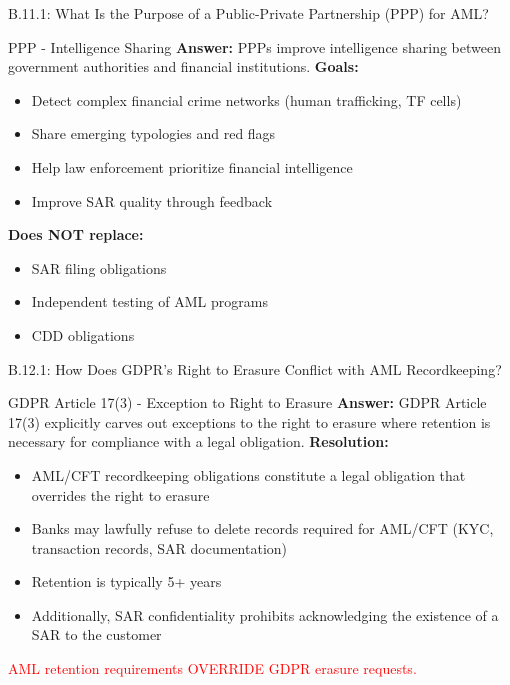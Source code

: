 \documentclass{beamer}
\begin{document}
	
	\begin{frame}{B.11.1: What Is the Purpose of a Public-Private Partnership (PPP) for AML?}
		\begin{block}{PPP - Intelligence Sharing}
			\textbf{Answer:} PPPs improve intelligence sharing between government authorities and financial institutions.
			\vspace{0.2cm}
			\textbf{Goals:}
			\begin{itemize}
				\item Detect complex financial crime networks (human trafficking, TF cells)
				\item Share emerging typologies and red flags
				\item Help law enforcement prioritize financial intelligence
				\item Improve SAR quality through feedback
			\end{itemize}
			\textbf{Does NOT replace:}
			\begin{itemize}
				\item SAR filing obligations
				\item Independent testing of AML programs
				\item CDD obligations
			\end{itemize}
		\end{block}
	\end{frame}
	
	
	\begin{frame}{B.12.1: How Does GDPR's Right to Erasure Conflict with AML Recordkeeping?}
		\begin{block}{GDPR Article 17(3) - Exception to Right to Erasure}
			\textbf{Answer:} GDPR Article 17(3) explicitly carves out exceptions to the right to erasure where retention is necessary for compliance with a legal obligation.
			\vspace{0.2cm}
			\textbf{Resolution:}
			\begin{itemize}
				\item AML/CFT recordkeeping obligations constitute a legal obligation that overrides the right to erasure
				\item Banks may lawfully refuse to delete records required for AML/CFT (KYC, transaction records, SAR documentation)
				\item Retention is typically 5+ years
				\item Additionally, SAR confidentiality prohibits acknowledging the existence of a SAR to the customer
			\end{itemize}
			\textcolor{red}{AML retention requirements OVERRIDE GDPR erasure requests.}
		\end{block}
	\end{frame}
	
\end{document}
